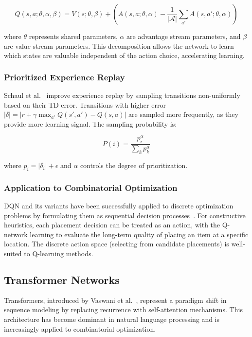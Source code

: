 \begin{equation}
Q(s,a;\theta,\alpha,\beta) = V(s;\theta,\beta) + \left(A(s,a;\theta,\alpha) - \frac{1}{|\mathcal{A}|}\sum_{a'} A(s,a';\theta,\alpha)\right)
\end{equation}

where $\theta$ represents shared parameters, $\alpha$ are advantage stream parameters, and $\beta$ are value stream parameters. This decomposition allows the network to learn which states are valuable independent of the action choice, accelerating learning.

\subsubsection{Prioritized Experience Replay}

Schaul et al.~\cite{schaul2015prioritized} improve experience replay by sampling transitions non-uniformly based on their TD error. Transitions with higher error $|\delta| = |r + \gamma \max_{a'} Q(s',a') - Q(s,a)|$ are sampled more frequently, as they provide more learning signal. The sampling probability is:

\begin{equation}
P(i) = \frac{p_i^\alpha}{\sum_k p_k^\alpha}
\end{equation}

where $p_i = |\delta_i| + \epsilon$ and $\alpha$ controls the degree of prioritization.

\subsubsection{Application to Combinatorial Optimization}

DQN and its variants have been successfully applied to discrete optimization problems by formulating them as sequential decision processes~\cite{dqn_irregular2023}. For constructive heuristics, each placement decision can be treated as an action, with the Q-network learning to evaluate the long-term quality of placing an item at a specific location. The discrete action space (selecting from candidate placements) is well-suited to Q-learning methods.

\subsection{Transformer Networks}

Transformers, introduced by Vaswani et al.~\cite{vaswani2017attention}, represent a paradigm shift in sequence modeling by replacing recurrence with self-attention mechanisms. This architecture has become dominant in natural language processing and is increasingly applied to combinatorial optimization.

